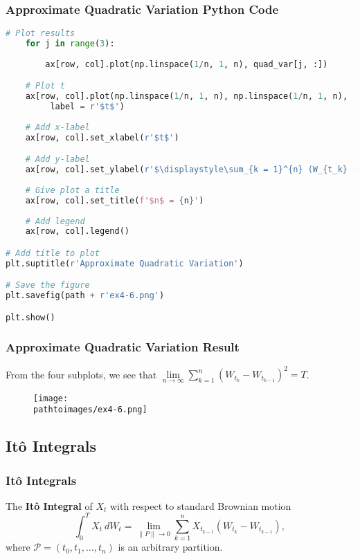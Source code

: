 \documentclass{beamer}
\newcommand{\pathtoimages}{/Users/charlesrambo/Desktop/Bootcamp24/Images}
\begin{document}
\begin{frame}[fragile]
\frametitle{Approximate Quadratic Variation Python Code}

\begin{lstlisting}[language=Python]    
    # Plot results
    for j in range(3):
        
        ax[row, col].plot(np.linspace(1/n, 1, n), quad_var[j, :])

    # Plot t
    ax[row, col].plot(np.linspace(1/n, 1, n), np.linspace(1/n, 1, n), 
         label = r'$t$')
    
    # Add x-label
    ax[row, col].set_xlabel(r'$t$')

    # Add y-label
    ax[row, col].set_ylabel(r'$\displaystyle\sum_{k = 1}^{n} (W_{t_k} - W_{t_{k - 1}})^2$')
    
    # Give plot a title
    ax[row, col].set_title(f'$n$ = {n}')
    
    # Add legend
    ax[row, col].legend()

# Add title to plot
plt.suptitle(r'Approximate Quadratic Variation')

# Save the figure
plt.savefig(path + r'ex4-6.png')

plt.show()
\end{lstlisting}
\end{frame}

\begin{frame}[fragile]
\frametitle{Approximate Quadratic Variation Result}
From the four subplots, we see that $\lim\limits_{n\to\infty} \sum_{k = 1}^n \left(W_{t_k} - W_{t_{k - 1}}\right)^2 = T$.
\begin{figure}
\centering
\texttt{[image: \\pathtoimages/ex4-6.png]}
\end{figure}
\end{frame}



\subsection{It\^o Integrals}

\begin{frame}
\frametitle{It\^o Integrals}
\begin{Definition}
The {\bf It\^o Integral} of $X_t$ with respect to standard Brownian motion
$$
\int_0^T X_t\ dW_t = \lim_{\| P\|\to 0} \sum_{k = 1}^{n } X_{t_{k - 1}} (W_{t_k} - W_{t_{k - 1}}),
$$
where $\mathcal{P} = (t_0, t_1,\ldots, t_n)$ is an arbitrary partition.
\end{Definition}

\end{frame}
\end{document}
